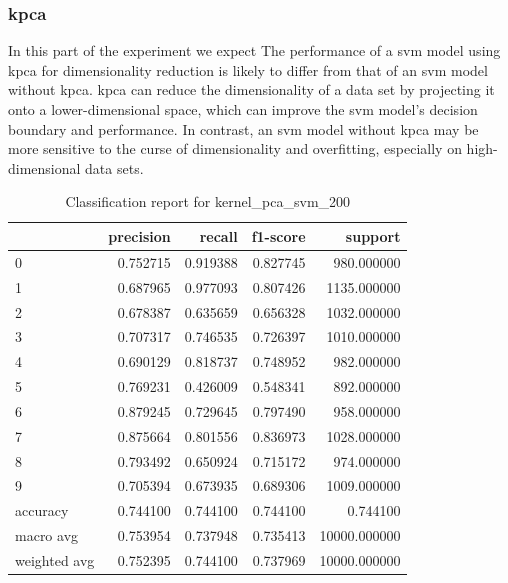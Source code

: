 \subsubsection{\gls{kpca}}\label{subsubsec:experiment_4_kernel_pca}
In this part of the experiment we expect The performance of a \gls{svm} model using  \gls{kpca} for dimensionality reduction is likely to differ from that of an \gls{svm} model without \gls{kpca}. \gls{kpca} can reduce the dimensionality of a data set by projecting it onto a lower-dimensional space, which can improve the \gls{svm} model's decision boundary and performance. In contrast, an \gls{svm} model without \gls{kpca} may be more sensitive to the curse of dimensionality and overfitting, especially on high-dimensional data sets. 

\begin{table}[htb!]
    \centering
    \begin{tabular}{lrrrr}
        \toprule
        & precision & recall & f1-score & support \\
        \midrule
        0 & 0.752715 & 0.919388 & 0.827745 & 980.000000 \\
        1 & 0.687965 & 0.977093 & 0.807426 & 1135.000000 \\
        2 & 0.678387 & 0.635659 & 0.656328 & 1032.000000 \\
    3 & 0.707317 & 0.746535 & 0.726397 & 1010.000000 \\
    4 & 0.690129 & 0.818737 & 0.748952 & 982.000000 \\
    5 & 0.769231 & 0.426009 & 0.548341 & 892.000000 \\
    6 & 0.879245 & 0.729645 & 0.797490 & 958.000000 \\
    7 & 0.875664 & 0.801556 & 0.836973 & 1028.000000 \\
    8 & 0.793492 & 0.650924 & 0.715172 & 974.000000 \\
    9 & 0.705394 & 0.673935 & 0.689306 & 1009.000000 \\
    accuracy & 0.744100 & 0.744100 & 0.744100 & 0.744100 \\
    macro avg & 0.753954 & 0.737948 & 0.735413 & 10000.000000 \\
    weighted avg & 0.752395 & 0.744100 & 0.737969 & 10000.000000 \\
    \bottomrule
\end{tabular}
\caption{Classification report for kernel\_pca\_svm\_200}
\label{tab:classification-report-kernel_pca_svm_200}
\end{table}


